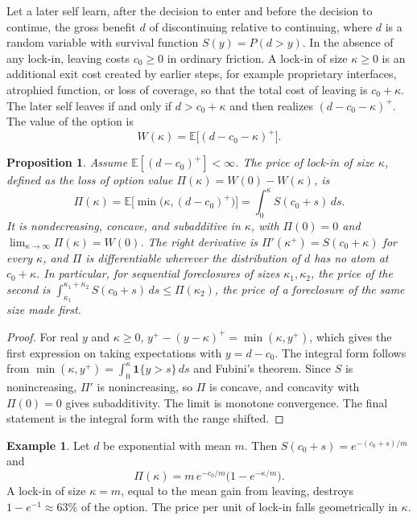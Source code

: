 \documentclass[11pt]{article}
\theoremstyle{plain}
\newtheorem{proposition}{Proposition}
\theoremstyle{definition}
\newtheorem{example}{Example}
\theoremstyle{remark}
\newcommand{\E}{\mathbb{E}}
\newcommand{\Ind}{\mathbf{1}}
\begin{document}
Let a later self learn, after the decision to enter and before the decision to continue, the gross benefit $d$ of discontinuing relative to continuing, where $d$ is a random variable with survival function $S(y)=P(d>y)$. In the absence of any lock-in, leaving costs $c_0\ge0$ in ordinary friction. A lock-in of size $\kappa\ge0$ is an additional exit cost created by earlier steps, for example proprietary interfaces, atrophied function, or loss of coverage, so that the total cost of leaving is $c_0+\kappa$. The later self leaves if and only if $d>c_0+\kappa$ and then realizes $(d-c_0-\kappa)^+$. The value of the option is
\begin{equation}\label{eq:optionvalue}
W(\kappa)=\E\big[(d-c_0-\kappa)^+\big].
\end{equation}

\begin{proposition}\label{prop:option}
Assume $\E[(d-c_0)^+]<\infty$. The price of lock-in of size $\kappa$, defined as the loss of option value $\Pi(\kappa)=W(0)-W(\kappa)$, is
\[
\Pi(\kappa)=\E\big[\min\big(\kappa,(d-c_0)^+\big)\big]=\int_0^\kappa S(c_0+s)\,ds.
\]
It is nondecreasing, concave, and subadditive in $\kappa$, with $\Pi(0)=0$ and $\lim_{\kappa\to\infty}\Pi(\kappa)=W(0)$. The right derivative is $\Pi'(\kappa^+)=S(c_0+\kappa)$ for every $\kappa$, and $\Pi$ is differentiable wherever the distribution of $d$ has no atom at $c_0+\kappa$. In particular, for sequential foreclosures of sizes $\kappa_1,\kappa_2$, the price of the second is $\int_{\kappa_1}^{\kappa_1+\kappa_2}S(c_0+s)\,ds\le\Pi(\kappa_2)$, the price of a foreclosure of the same size made first.
\end{proposition}

\begin{proof}
For real $y$ and $\kappa\ge0$, $y^+-(y-\kappa)^+=\min(\kappa,y^+)$, which gives the first expression on taking expectations with $y=d-c_0$. The integral form follows from $\min(\kappa,y^+)=\int_0^\kappa\Ind\{y>s\}\,ds$ and Fubini's theorem. Since $S$ is nonincreasing, $\Pi'$ is nonincreasing, so $\Pi$ is concave, and concavity with $\Pi(0)=0$ gives subadditivity. The limit is monotone convergence. The final statement is the integral form with the range shifted.
\end{proof}

\begin{example}
Let $d$ be exponential with mean $m$. Then $S(c_0+s)=e^{-(c_0+s)/m}$ and
\[
\Pi(\kappa)=m\,e^{-c_0/m}\big(1-e^{-\kappa/m}\big).
\]
A lock-in of size $\kappa=m$, equal to the mean gain from leaving, destroys $1-e^{-1}\approx63\%$ of the option. The price per unit of lock-in falls geometrically in $\kappa$.
\end{example}
\end{document}
